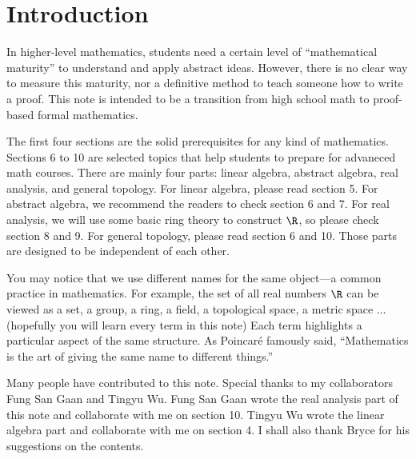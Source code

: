 \documentclass[10pt]{article}
\begin{document}
\hsetup
\htoc
\hmain
\section*{Introduction}
In higher-level mathematics, students need a certain level of ``mathematical maturity'' to understand and apply abstract ideas. However, there is no clear way to measure this maturity, nor a definitive method to teach someone how to write a proof. This note is intended to be a transition from high school math to proof-based formal mathematics.
\par
The first four sections are the solid prerequisites for any kind of mathematics. Sections 6 to 10 are selected topics that help students to prepare for advaneced math courses. There are mainly four parts: linear algebra, abstract algebra, real analysis, and general topology. For linear algebra, please read section 5. For abstract algebra, we recommend the readers to check section 6 and 7. For real analysis, we will use some basic ring theory to construct $\R$, so please check section 8 and 9. For general topology, please read section 6 and 10. Those parts are designed to be independent of each other.
\par
You may notice that we use different names for the same object—a common practice in mathematics. For example, the set of all real numbers $\R$ can be viewed as a set, a group, a ring, a field, a topological space, a metric space $\dots$ (hopefully you will learn every term in this note) Each term highlights a particular aspect of the same structure. As Poincaré famously said, ``Mathematics is the art of giving the same name to different things.''
\par
Many people have contributed to this note. Special thanks to my collaborators Fung San Gaan and Tingyu Wu. Fung San Gaan wrote the real analysis part of this note and collaborate with me on section 10. Tingyu Wu wrote the linear algebra part and collaborate with me on section 4. I shall also thank Bryce for his suggestions on the contents.
\end{document}
